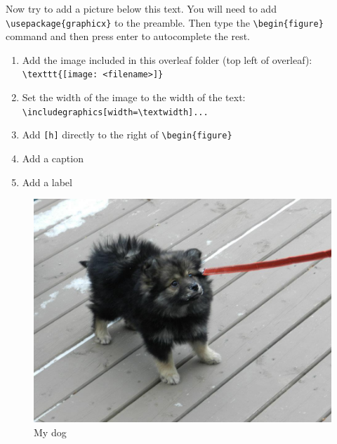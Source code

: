         Now try to add a picture below this text. You will need to add \verb"\usepackage{graphicx}" to the preamble. Then type the \verb"\begin{figure}" command and then press enter to autocomplete the rest.
        

        \begin{enumerate}
            \item Add the image included in this overleaf folder (top left of overleaf): \verb"\texttt{[image: <filename>]}"
            \item Set the width of the image to the width of the text:\\    \verb"\includegraphics[width=\textwidth]..."
            \item Add \verb"[h]" directly to the right of \verb"\begin{figure}"
            \item Add a caption
            \item Add a label
        \end{enumerate}

        \begin{figure}[h]
            \centering
            \includegraphics[width=\textwidth]{handout/dog.jpg}
            \caption{My dog}
            \label{fig:my-dog}
        \end{figure}

